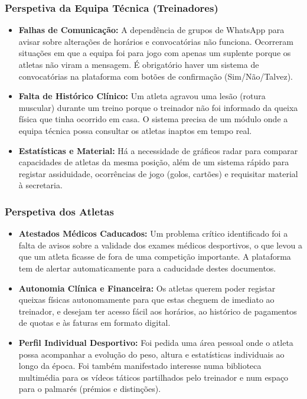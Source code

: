
\subsubsection*{Perspetiva da Equipa Técnica (Treinadores)}
\begin{itemize}
    \item \textbf{Falhas de Comunicação:} A dependência de grupos de WhatsApp para avisar sobre alterações de horários e convocatórias não funciona. Ocorreram situações em que a equipa foi para jogo com apenas um suplente porque os atletas não viram a mensagem. É obrigatório haver um sistema de convocatórias na plataforma com botões de confirmação (Sim/Não/Talvez).
    \item \textbf{Falta de Histórico Clínico:} Um atleta agravou uma lesão (rotura muscular) durante um treino porque o treinador não foi informado da queixa física que tinha ocorrido em casa. O sistema precisa de um módulo onde a equipa técnica possa consultar os atletas inaptos em tempo real.
    \item \textbf{Estatísticas e Material:} Há a necessidade de gráficos radar para comparar capacidades de atletas da mesma posição, além de um sistema rápido para registar assiduidade, ocorrências de jogo (golos, cartões) e requisitar material à secretaria.
\end{itemize}


\subsubsection*{Perspetiva dos Atletas}
\begin{itemize}
    \item \textbf{Atestados Médicos Caducados:} Um problema crítico identificado foi a falta de avisos sobre a validade dos exames médicos desportivos, o que levou a que um atleta ficasse de fora de uma competição importante. A plataforma tem de alertar automaticamente para a caducidade destes documentos.
    \item \textbf{Autonomia Clínica e Financeira:} Os atletas querem poder registar queixas físicas autonomamente para que estas cheguem de imediato ao treinador, e desejam ter acesso fácil aos horários, ao histórico de pagamentos de quotas e às faturas em formato digital.
    \item \textbf{Perfil Individual Desportivo:} Foi pedida uma área pessoal onde o atleta possa acompanhar a evolução do peso, altura e estatísticas individuais ao longo da época. Foi também manifestado interesse numa biblioteca multimédia para os vídeos táticos partilhados pelo treinador e num espaço para o palmarés (prémios e distinções).
\end{itemize}

